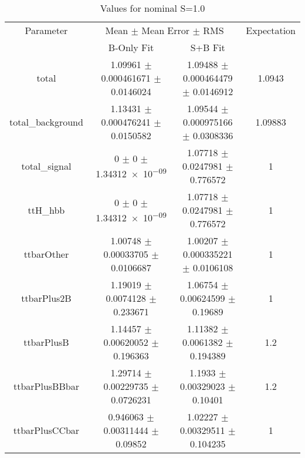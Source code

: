 \begin{table}
\centering
\caption{Values for nominal S=1.0}
\begin{tabular}{cccc}
\toprule
Parameter & \multicolumn{2}{c}{Mean $\pm$ Mean Error $\pm$ RMS} & Expectation\\
 & B-Only Fit & S+B Fit & \\
\midrule
total & \num{1.09961} $\pm$ \num{0.000461671} $\pm$ \num{0.0146024} & \num{1.09488} $\pm$ \num{0.000464479} $\pm$ \num{0.0146912} & \num{1.0943}\\
total\_background & \num{1.13431} $\pm$ \num{0.000476241} $\pm$ \num{0.0150582} & \num{1.09544} $\pm$ \num{0.000975166} $\pm$ \num{0.0308336} & \num{1.09883}\\
total\_signal & \num{0} $\pm$ \num{0} $\pm$ \num{1.34312e-09} & \num{1.07718} $\pm$ \num{0.0247981} $\pm$ \num{0.776572} & \num{1}\\
ttH\_hbb & \num{0} $\pm$ \num{0} $\pm$ \num{1.34312e-09} & \num{1.07718} $\pm$ \num{0.0247981} $\pm$ \num{0.776572} & \num{1}\\
ttbarOther & \num{1.00748} $\pm$ \num{0.00033705} $\pm$ \num{0.0106687} & \num{1.00207} $\pm$ \num{0.000335221} $\pm$ \num{0.0106108} & \num{1}\\
ttbarPlus2B & \num{1.19019} $\pm$ \num{0.0074128} $\pm$ \num{0.233671} & \num{1.06754} $\pm$ \num{0.00624599} $\pm$ \num{0.19689} & \num{1}\\
ttbarPlusB & \num{1.14457} $\pm$ \num{0.00620052} $\pm$ \num{0.196363} & \num{1.11382} $\pm$ \num{0.0061382} $\pm$ \num{0.194389} & \num{1.2}\\
ttbarPlusBBbar & \num{1.29714} $\pm$ \num{0.00229735} $\pm$ \num{0.0726231} & \num{1.1933} $\pm$ \num{0.00329023} $\pm$ \num{0.10401} & \num{1.2}\\
ttbarPlusCCbar & \num{0.946063} $\pm$ \num{0.00311444} $\pm$ \num{0.09852} & \num{1.02227} $\pm$ \num{0.00329511} $\pm$ \num{0.104235} & \num{1}\\
\bottomrule
\end{tabular}
\end{table}
